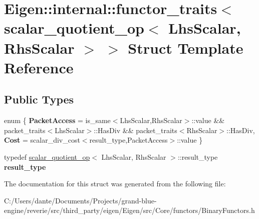 \hypertarget{struct_eigen_1_1internal_1_1functor__traits_3_01scalar__quotient__op_3_01_lhs_scalar_00_01_rhs_scalar_01_4_01_4}{}\section{Eigen\+::internal\+::functor\+\_\+traits$<$ scalar\+\_\+quotient\+\_\+op$<$ Lhs\+Scalar, Rhs\+Scalar $>$ $>$ Struct Template Reference}
\label{struct_eigen_1_1internal_1_1functor__traits_3_01scalar__quotient__op_3_01_lhs_scalar_00_01_rhs_scalar_01_4_01_4}
\subsection*{Public Types}
\begin{DoxyCompactItemize}
\item 
\mbox{\label{struct_eigen_1_1internal_1_1functor__traits_3_01scalar__quotient__op_3_01_lhs_scalar_00_01_rhs_scalar_01_4_01_4_a9708528f3a2dfda609dd81c071aa56e0}} 
enum \{ {\bfseries Packet\+Access} = is\+\_\+same$<$Lhs\+Scalar,Rhs\+Scalar$>$\+::value \&\& packet\+\_\+traits$<$Lhs\+Scalar$>$\+::Has\+Div \&\& packet\+\_\+traits$<$Rhs\+Scalar$>$\+::Has\+Div, 
{\bfseries Cost} = scalar\+\_\+div\+\_\+cost$<$result\+\_\+type,Packet\+Access$>$\+::value
 \}
\item 
\mbox{\label{struct_eigen_1_1internal_1_1functor__traits_3_01scalar__quotient__op_3_01_lhs_scalar_00_01_rhs_scalar_01_4_01_4_a39bf7b81b9497502f4fff984dde9aa99}} 
typedef \mbox{\hyperlink{struct_eigen_1_1internal_1_1scalar__quotient__op}{scalar\+\_\+quotient\+\_\+op}}$<$ Lhs\+Scalar, Rhs\+Scalar $>$\+::result\+\_\+type {\bfseries result\+\_\+type}
\end{DoxyCompactItemize}


The documentation for this struct was generated from the following file\+:\begin{DoxyCompactItemize}
\item 
C\+:/\+Users/dante/\+Documents/\+Projects/grand-\/blue-\/engine/reverie/src/third\+\_\+party/eigen/\+Eigen/src/\+Core/functors/Binary\+Functors.\+h\end{DoxyCompactItemize}
